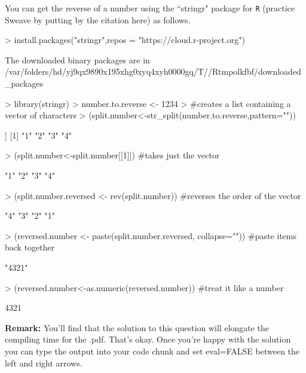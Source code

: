 \documentclass{article}
\begin{document}
\begin{enumerate}
  You can get the reverse of a number using the ``stringr" package for \texttt{R}
  (practice Sweave by putting by the citation here) as follows.
\begin{Schunk}
\begin{Sinput}
> install.packages("stringr",repos = "https://cloud.r-project.org")
\end{Sinput}
\begin{Soutput}
The downloaded binary packages are in
	/var/folders/hd/yj9qx9890x195xhg0xyq4xyh0000gq/T//Rtmpolkfbf/downloaded_packages
\end{Soutput}
\begin{Sinput}
> library(stringr)
> number.to.reverse <- 1234
> #creates a list containing a vector of characters
> (split.number<-str_split(number.to.reverse,pattern=""))
\end{Sinput}
\begin{Soutput}
[[1]]
[1] "1" "2" "3" "4"
\end{Soutput}
\begin{Sinput}
> (split.number<-split.number[[1]]) #takes just the vector
\end{Sinput}
\begin{Soutput}
[1] "1" "2" "3" "4"
\end{Soutput}
\begin{Sinput}
> (split.number.reversed <- rev(split.number)) #reverses the order of the vector
\end{Sinput}
\begin{Soutput}
[1] "4" "3" "2" "1"
\end{Soutput}
\begin{Sinput}
> (reversed.number <- paste(split.number.reversed, collapse="")) #paste items back together
\end{Sinput}
\begin{Soutput}
[1] "4321"
\end{Soutput}
\begin{Sinput}
> (reversed.number<-as.numeric(reversed.number)) #treat it like a number
\end{Sinput}
\begin{Soutput}
[1] 4321
\end{Soutput}
\end{Schunk}
\textbf{Remark:} You'll find that the solution to this question will elongate the
compiling time for the .pdf. That's okay. Once you're happy with the solution 
you can type the output into your code chunk and set eval=FALSE between the left
and right arrows.
\newpage

\end{enumerate}
\end{document}
